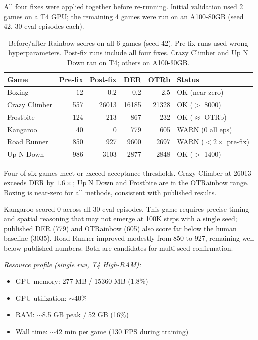 \documentclass[11pt]{article}
\newcommand{\ok}{\textcolor{green!60!black}{OK}}
\newcommand{\warn}{\textcolor{orange!80!black}{WARN}}
\begin{document}
All four fixes were applied together before re-running. Initial
validation used 2 games on a T4 GPU; the remaining 4 games were
run on an A100-80GB (seed 42, 30 eval episodes each).

\begin{table}[H]
\centering
\small
\renewcommand{\arraystretch}{1.5}
\setlength{\tabcolsep}{6pt}
\begin{tabular}{l rrrrl}
\toprule
\textbf{Game} & \textbf{Pre-fix} & \textbf{Post-fix}
  & \textbf{DER} & \textbf{OTRb} & \textbf{Status} \\
\midrule
Boxing        & $-12$ & $-0.2$ & 0.2   & 2.5   & \ok{} (near-zero) \\
Crazy Climber & 557   & 26013  & 16185 & 21328 & \ok{} ($>$ 8000) \\
Frostbite     & 124   & 213    & 867   & 232   & \ok{} ($\approx$ OTRb) \\
Kangaroo      & 40    & 0      & 779   & 605   & \warn{} (0 all eps) \\
Road Runner   & 850   & 927    & 9600  & 2697  & \warn{} ($< 2\times$ pre-fix) \\
Up N Down     & 986   & 3103   & 2877  & 2848  & \ok{} ($>$ 1400) \\
\bottomrule
\end{tabular}
\caption{Before/after Rainbow scores on all 6 games (seed 42).
Pre-fix runs used wrong hyperparameters. Post-fix runs include all
four fixes. Crazy Climber and Up N Down ran on T4; others on
A100-80GB.}
\end{table}

Four of six games meet or exceed acceptance thresholds. Crazy Climber
at 26013 exceeds DER by $1.6\times$; Up N Down and Frostbite are in
the OTRainbow range. Boxing is near-zero for all methods, consistent
with published results.

Kangaroo scored 0 across all 30 eval episodes. This game requires
precise timing and spatial reasoning that may not emerge at 100K
steps with a single seed; published DER (779) and OTRainbow (605)
also score far below the human baseline (3035). Road Runner improved
modestly from 850 to 927, remaining well below published numbers.
Both are candidates for multi-seed confirmation.

\noindent\textit{Resource profile (single run, T4 High-RAM):}
\begin{itemize}[leftmargin=2em, itemsep=0.1em]
  \item GPU memory: 277 MB / 15360 MB (1.8\%)
  \item GPU utilization: $\sim$40\%
  \item RAM: $\sim$8.5 GB peak / 52 GB (16\%)
  \item Wall time: $\sim$42 min per game (130 FPS during training)
\end{itemize}
\end{document}
